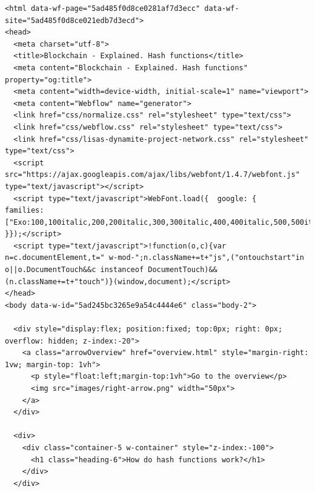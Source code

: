 \begin{lstlisting}
<html data-wf-page="5ad485f0d8ce0281af7d3ecc" data-wf-site="5ad485f0d8ce021edb7d3ecd">
<head>
  <meta charset="utf-8">
  <title>Blockchain - Explained. Hash functions</title>
  <meta content="Blockchain - Explained. Hash functions" property="og:title">
  <meta content="width=device-width, initial-scale=1" name="viewport">
  <meta content="Webflow" name="generator">
  <link href="css/normalize.css" rel="stylesheet" type="text/css">
  <link href="css/webflow.css" rel="stylesheet" type="text/css">
  <link href="css/lisas-dynamite-project-network.css" rel="stylesheet" type="text/css">
  <script src="https://ajax.googleapis.com/ajax/libs/webfont/1.4.7/webfont.js" type="text/javascript"></script>
  <script type="text/javascript">WebFont.load({  google: {    families: ["Exo:100,100italic,200,200italic,300,300italic,400,400italic,500,500italic,600,600italic,700,700italic,800,800italic,900,900italic","Roboto:100,100italic,300,300italic,regular,italic,500,500italic,700,700italic,900,900italic"]  }});</script>
  <script type="text/javascript">!function(o,c){var n=c.documentElement,t=" w-mod-";n.className+=t+"js",("ontouchstart"in o||o.DocumentTouch&&c instanceof DocumentTouch)&&(n.className+=t+"touch")}(window,document);</script>
</head>
<body data-w-id="5ad245bc3265e9a54c4444e6" class="body-2">

  <div style="display:flex; position:fixed; top:0px; right: 0px; overflow: hidden; z-index:-20">
    <a class="arrowOverview" href="overview.html" style="margin-right: 1vw; margin-top: 1vh">
      <p style="float:left;margin-top:1vh">Go to the overview</p>
      <img src="images/right-arrow.png" width="50px">
    </a>
  </div>

  <div>
    <div class="container-5 w-container" style="z-index:-100">
      <h1 class="heading-6">How do hash functions work?</h1>
    </div>
  </div>


\end{lstlisting}
